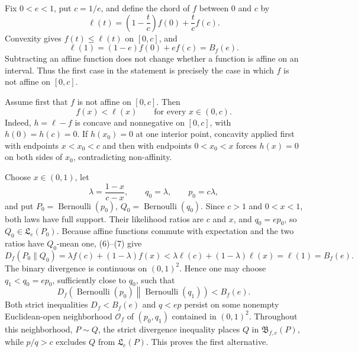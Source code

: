 Fix \(0<e<1\), put \(c=1/e\), and define the chord of \(f\) between \(0\) and \(c\) by
\[
 \ell(t)=\left(1-\frac tc\right)f(0)+\frac tc f(c).
\]
Convexity gives \(f(t)\le\ell(t)\) on \([0,c]\), and
\[
 \ell(1)=(1-e)f(0)+ef(c)=B_f(e). \tag{6}
\]
Subtracting an affine function does not change whether a function is affine on an interval.  Thus the first case in the statement is precisely the case in which \(f\) is not affine on \([0,c]\).

Assume first that \(f\) is not affine on \([0,c]\).  Then
\[
 f(x)<\ell(x)\qquad\text{for every }x\in(0,c). \tag{7}
\]
Indeed, \(h=\ell-f\) is concave and nonnegative on \([0,c]\), with \(h(0)=h(c)=0\).  If \(h(x_0)=0\) at one interior point, concavity applied first with endpoints \(x<x_0<c\) and then with endpoints \(0<x_0<x\) forces \(h(x)=0\) on both sides of \(x_0\), contradicting non-affinity.

Choose \(x\in(0,1)\), let
\[
 \lambda=\frac{1-x}{c-x},\qquad q_0=\lambda,\qquad p_0=c\lambda,
\]
and put \(P_0=\operatorname{Bernoulli}(p_0)\), \(Q_0=\operatorname{Bernoulli}(q_0)\).  Since \(c>1\) and \(0<x<1\), both laws have full support.  Their likelihood ratios are \(c\) and \(x\), and \(q_0=ep_0\), so \(Q_0\in\mathfrak L_e(P_0)\).  Because affine functions commute with expectation and the two ratios have \(Q_0\)-mean one, (6)--(7) give
\[
 D_f(P_0\|Q_0)
 =\lambda f(c)+(1-\lambda)f(x)
 <\lambda\ell(c)+(1-\lambda)\ell(x)
 =\ell(1)=B_f(e). \tag{8}
\]
The binary divergence is continuous on \((0,1)^2\).  Hence one may choose \(q_1<q_0=ep_0\), sufficiently close to \(q_0\), such that
\[
 D_f\!\left(\operatorname{Bernoulli}(p_0)\middle\|\operatorname{Bernoulli}(q_1)\right)<B_f(e).
\]
Both strict inequalities \(D_f<B_f(e)\) and \(q<ep\) persist on some nonempty Euclidean-open neighborhood \(\mathcal O_f\) of \((p_0,q_1)\) contained in \((0,1)^2\).  Throughout this neighborhood, \(P\sim Q\), the strict divergence inequality places \(Q\) in \(\mathfrak B_{f,e}(P)\), while \(p/q>c\) excludes \(Q\) from \(\mathfrak L_e(P)\).  This proves the first alternative.


